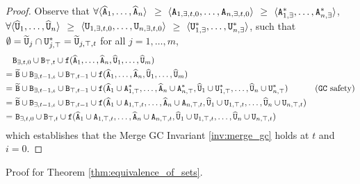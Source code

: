 \begin{proof}
Observe that $\forall \langle \widehat{\tt{A}}_1, \dots, \widehat{\tt{A}}_n \rangle$ $\geq$ $\langle \tt{A}_{1,\exists,t,0}, \dots, \tt{A}_{n,\exists,t,0} \rangle$ $\geq$ $\langle \tt{A}_{1,\exists}^*, \dots, \tt{A}_{n,\exists}^* \rangle$,
$\forall \langle \widehat{\tt{U}}_1, \dots, \widehat{\tt{U}}_n \rangle$ $\geq$ $\langle \tt{U}_{1,\exists,t,0}, \dots, \tt{U}_{n,\exists,t,0} \rangle$ $\geq$ $\langle \tt{U}_{1,\exists}^*, \dots, \tt{U}_{n,\exists}^* \rangle$,
such that $\emptyset = \widetilde{\tt{U}}_j \cap \tt{U}_{j,\top}^* = \widetilde{\tt{U}}_{j,\top,t}$ for all $j = 1,\dots,m$,
\begin{align*}
&
\tt{B}_{\exists,t,0} \cup \tt{B}_{\top,t}
\cup \tt{f}(\widehat{\tt{A}}_1, \dots, \widehat{\tt{A}}_n, \widehat{\tt{U}}_1, \dots, \widehat{\tt{U}}_m)
\\
=&~
\widetilde{\tt{B}} \cup \tt{B}_{\exists,t-1,\iota} \cup \tt{B}_{\top,t-1}
\cup \tt{f}(\widehat{\tt{A}}_1, \dots, \widehat{\tt{A}}_n, \widehat{\tt{U}}_1, \dots, \widehat{\tt{U}}_m)
\\
=&~
\widetilde{\tt{B}} \cup \tt{B}_{\exists,t-1,\iota} \cup \tt{B}_{\top,t-1}
\cup \tt{f}(
\widehat{\tt{A}}_1 \cup \tt{A}_{1,\top}^*, \dots, \widehat{\tt{A}}_n \cup \tt{A}_{n,\top}^*,
\widehat{\tt{U}}_1 \cup \tt{U}_{1,\top}^*, \dots, \widehat{\tt{U}}_n \cup \tt{U}_{n,\top}^*)
&\text{(\tt{GC} safety)}
\\
=&~
\widetilde{\tt{B}} \cup \tt{B}_{\exists,t-1,\iota} \cup \tt{B}_{\top,t-1}
\cup \tt{f}(
\widehat{\tt{A}}_1 \cup \tt{A}_{1,\top,t}, \dots, \widehat{\tt{A}}_n \cup \tt{A}_{n,\top,t},
\widehat{\tt{U}}_1 \cup \tt{U}_{1,\top,t}, \dots, \widehat{\tt{U}}_n \cup \tt{U}_{n,\top,t})
\\
=&~
\tt{B}_{\exists,t,0} \cup \tt{B}_{\top,t}
\cup \tt{f}(
\widehat{\tt{A}}_1 \cup \tt{A}_{1,\top,t}, \dots, \widehat{\tt{A}}_n \cup \tt{A}_{n,\top,t},
\widehat{\tt{U}}_1 \cup \tt{U}_{1,\top,t}, \dots, \widehat{\tt{U}}_n \cup \tt{U}_{n,\top,t})
\end{align*}
which establishes that the Merge GC Invariant \ref{inv:merge_gc} holds at $t$ and $i=0$.
\end{proof}



Proof for Theorem \ref{thm:equivalence_of_sets}.

